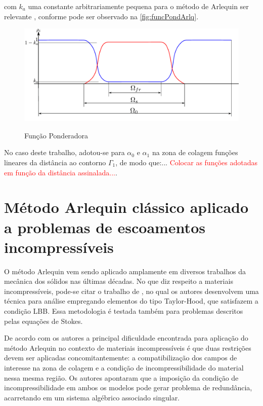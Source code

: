 \noindent com $k_a$ uma constante arbitrariamente pequena para o método de Arlequin ser relevante \cite{Dhia:2008}, conforme pode ser observado na \autoref{fig:funcPondArlq}.

\begin{figure}[!htbp]
	\caption{Função Ponderadora}
	\centering 
	\includegraphics[scale=0.6,trim=0cm 0cm 0cm 0.0cm, clip=true]{Imagens/Cap6/funcPondArlq.pdf}	
	\label{fig:funcPondArlq}
\end{figure}

No caso deste trabalho, adotou-se para $\alpha_0$ e $\alpha_1$ na zona de colagem funções lineares da distância ao contorno $\Gamma_1$, de modo que:... \textcolor{red}{Colocar as funções adotadas em função da distância assinalada...}.

\section{Método Arlequin clássico aplicado a problemas de escoamentos incompressíveis}

O método Arlequin vem sendo aplicado amplamente em diversos trabalhos da mecânica dos sólidos nas últimas décadas. No que diz respeito a materiais incompressíveis, pode-se citar o trabalho de , no qual os autores desenvolvem uma técnica para análise empregando elementos do tipo Taylor-Hood, que satisfazem a condição LBB. Essa metodologia é testada também para problemas descritos pelas equações de Stokes.

De acordo com os autores  a principal dificuldade encontrada para aplicação do método Arlequin no contexto de materiais incompressíveis é que duas restrições devem ser aplicadas concomitantemente: a compatibilização dos campos de interesse na zona de colagem e a condição de incompressibilidade do material nessa mesma região. Os autores apontaram que a imposição da condição de incompressibilidade em ambos os modelos pode gerar problema de redundância, acarretando em um sistema algébrico associado singular.


